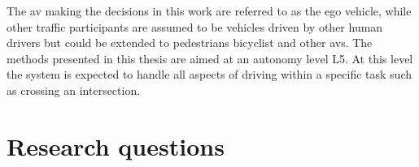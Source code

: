 
The \gls{av} making the decisions in this work are referred to as the ego vehicle, while other traffic participants are assumed to be vehicles driven by other human drivers but could be extended to pedestrians bicyclist and other \gls{av}s. 
The methods presented in this thesis are aimed at an autonomy level L5. At this level the system is expected to handle all aspects of driving within a specific task such as crossing an intersection. 

\section{Research questions}
\label{sec:research_questions}


	
